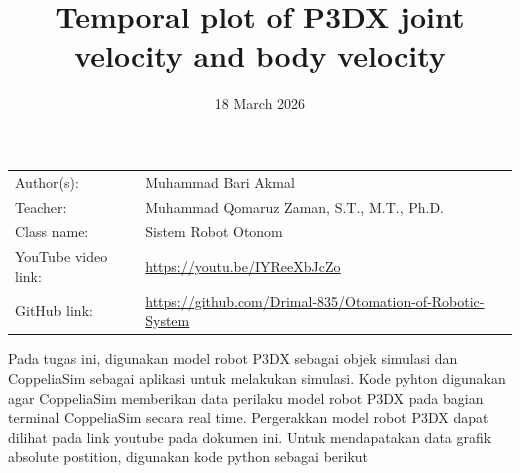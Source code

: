 \documentclass{article}
\title{Temporal plot of P3DX joint velocity and body velocity
}
\date{18 March 2026}
\begin{document}
\maketitle


\noindent\begin{tabular}{@{}ll}
    Author(s): & Muhammad Bari Akmal\\
     Teacher: &  Muhammad Qomaruz Zaman, S.T., M.T., Ph.D.\\
     Class name: & Sistem Robot Otonom\\
     YouTube video link: & \url{https://youtu.be/IYReeXbJcZo} \\
     GitHub link: & \url{https://github.com/Drimal-835/Otomation-of-Robotic-System}
\end{tabular}
\vspace{2cm}


Pada tugas ini, digunakan model robot P3DX sebagai objek simulasi dan CoppeliaSim sebagai aplikasi untuk melakukan simulasi. Kode pyhton digunakan agar CoppeliaSim memberikan data perilaku model robot P3DX pada bagian terminal CoppeliaSim secara real time. Pergerakkan model robot P3DX dapat dilihat pada link youtube pada dokumen ini. Untuk mendapatakan data grafik absolute postition, digunakan kode python sebagai berikut
\end{document}
